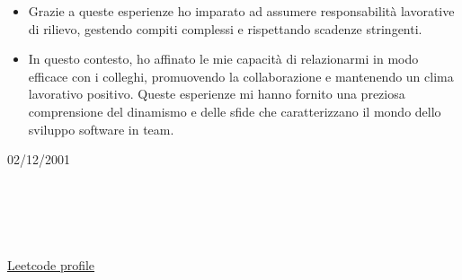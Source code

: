\documentclass[10pt,a4paper,ragged2e,withhyper]{other/altacv}
\begin{document}
\begin{paracol}{2}



\begin{itemize}
    \item Grazie a queste esperienze ho imparato ad assumere responsabilità lavorative di rilievo, gestendo compiti complessi e rispettando scadenze stringenti.
    \item In questo contesto, ho affinato le mie capacità di relazionarmi in modo efficace con i colleghi, promuovendo la collaborazione e mantenendo un clima lavorativo positivo. Queste esperienze mi hanno fornito una preziosa comprensione del dinamismo e delle sfide che caratterizzano il mondo dello sviluppo software in team.
\end{itemize}

\switchcolumn


\textcolor[RGB]{139, 0, 0}{\faBirthdayCake{}} 02/12/2001\\
\vspace{2.5pt}
\\
\vspace{2.5pt}
\\
\vspace{2.5pt}
\\
\vspace{2.5pt}
\\
\vspace{2.5pt}
\\
\vspace{2.5pt}
\textcolor[RGB]{139, 0, 0}{}\href{https://leetcode.com/HumbleUser/}{ Leetcode profile}

\medskip


\end{paracol}
\end{document}
